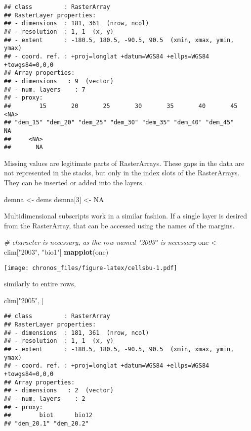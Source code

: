 \documentclass[]{article}
\newenvironment{Shaded}{\begin{snugshade}}{\end{snugshade}}
\newcommand{\CommentTok}[1]{\textcolor[rgb]{0.56,0.35,0.01}{\textit{#1}}}
\newcommand{\DecValTok}[1]{\textcolor[rgb]{0.00,0.00,0.81}{#1}}
\newcommand{\KeywordTok}[1]{\textcolor[rgb]{0.13,0.29,0.53}{\textbf{#1}}}
\newcommand{\NormalTok}[1]{#1}
\newcommand{\OtherTok}[1]{\textcolor[rgb]{0.56,0.35,0.01}{#1}}
\newcommand{\StringTok}[1]{\textcolor[rgb]{0.31,0.60,0.02}{#1}}
\begin{document}
\begin{verbatim}
## class         : RasterArray 
## RasterLayer properties: 
## - dimensions  : 181, 361  (nrow, ncol)
## - resolution  : 1, 1  (x, y)
## - extent      : -180.5, 180.5, -90.5, 90.5  (xmin, xmax, ymin, ymax)
## - coord. ref. : +proj=longlat +datum=WGS84 +ellps=WGS84 +towgs84=0,0,0 
## Array properties: 
## - dimensions   : 9  (vector)
## - num. layers    : 7
## - proxy:
##        15       20       25       30       35       40       45     <NA> 
## "dem_15" "dem_20" "dem_25" "dem_30" "dem_35" "dem_40" "dem_45"       NA 
##     <NA> 
##       NA
\end{verbatim}

Missing values are legitimate parts of RasterArrays. These gaps in the
data are not represented in the stacks, but only in the index slots of
the RasterArrays. They can be inserted or added into the layers.

\begin{Shaded}
\begin{Highlighting}[]
\NormalTok{demna <-}\StringTok{ }\NormalTok{dems}
\NormalTok{demna[}\DecValTok{3}\NormalTok{] <-}\StringTok{ }\OtherTok{NA}
\end{Highlighting}
\end{Shaded}

Multidimensional subscripts work in a similar fashion. If a single layer
is desired from the RasterArray, that can be accessed using the names of
the margins.

\begin{Shaded}
\begin{Highlighting}[]
\CommentTok{# character is necessary, as the row named "2003" is necessary}
\NormalTok{one <-}\StringTok{ }\NormalTok{clim[}\StringTok{"2003"}\NormalTok{, }\StringTok{"bio1"}\NormalTok{]}
\KeywordTok{mapplot}\NormalTok{(one)}
\end{Highlighting}
\end{Shaded}

\texttt{[image: chronos\_files/figure-latex/cellsbu-1.pdf]}

similarly to entire rows,

\begin{Shaded}
\begin{Highlighting}[]
\NormalTok{clim[}\StringTok{"2005"}\NormalTok{, ]}
\end{Highlighting}
\end{Shaded}

\begin{verbatim}
## class         : RasterArray 
## RasterLayer properties: 
## - dimensions  : 181, 361  (nrow, ncol)
## - resolution  : 1, 1  (x, y)
## - extent      : -180.5, 180.5, -90.5, 90.5  (xmin, xmax, ymin, ymax)
## - coord. ref. : +proj=longlat +datum=WGS84 +ellps=WGS84 +towgs84=0,0,0 
## Array properties: 
## - dimensions   : 2  (vector)
## - num. layers    : 2
## - proxy:
##        bio1      bio12 
## "dem_20.1" "dem_20.2"
\end{verbatim}
\end{document}
